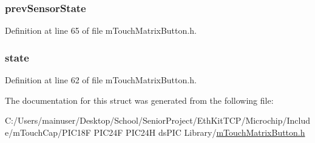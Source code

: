 \subsubsection[{prev\+Sensor\+State}]{ prev\+Sensor\+State}\label{structtag___m_t_o_u_c_h_m_a_t_r_i_x_b_u_t_t_o_n_ae404837b36327a7f5dc7ec0945a80d8e}


Definition at line 65 of file m\+Touch\+Matrix\+Button.\+h.

\hypertarget{structtag___m_t_o_u_c_h_m_a_t_r_i_x_b_u_t_t_o_n_a6e9c4cbd32a1178b12f3a61f6855c896}{}
\subsubsection[{state}]{ state}\label{structtag___m_t_o_u_c_h_m_a_t_r_i_x_b_u_t_t_o_n_a6e9c4cbd32a1178b12f3a61f6855c896}


Definition at line 62 of file m\+Touch\+Matrix\+Button.\+h.



The documentation for this struct was generated from the following file\+:\begin{DoxyCompactItemize}
\item 
C\+:/\+Users/mainuser/\+Desktop/\+School/\+Senior\+Project/\+Eth\+Kit\+T\+C\+P/\+Microchip/\+Include/m\+Touch\+Cap/\+P\+I\+C18\+F P\+I\+C24\+F P\+I\+C24\+H ds\+P\+I\+C Library/\hyperlink{m_touch_matrix_button_8h}{m\+Touch\+Matrix\+Button.\+h}\end{DoxyCompactItemize}
